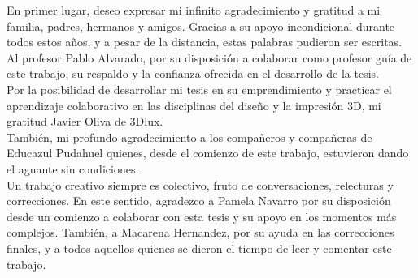 
\begin{gracias}
En primer lugar, deseo expresar mi infinito agradecimiento y gratitud a mi familia, padres, hermanos y amigos. Gracias a su apoyo incondicional durante todos estos años, y a pesar de la distancia, estas palabras pudieron ser escritas. \\

Al profesor Pablo Alvarado, por su disposición a colaborar como profesor guía de este trabajo, su respaldo y la confianza ofrecida en el desarrollo de la tesis.\\

Por la posibilidad de desarrollar mi tesis en su emprendimiento y practicar el aprendizaje colaborativo en las disciplinas del diseño y la impresión 3D, mi gratitud Javier Oliva de 3Dlux.\\

También, mi profundo agradecimiento a los compañeros y compañeras de Educazul Pudahuel quienes, desde el comienzo de este trabajo, estuvieron dando el aguante sin condiciones.\\

Un trabajo creativo siempre es colectivo, fruto de conversaciones, relecturas y correcciones. En este sentido, agradezco a Pamela Navarro por su disposición desde un comienzo a colaborar con esta tesis y su apoyo en los momentos más complejos. También, a Macarena Hernandez, por su ayuda en las correcciones finales, y a todos aquellos quienes se dieron el tiempo de leer y comentar este trabajo. 


\end{gracias}